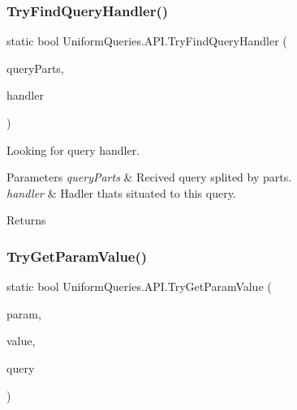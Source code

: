 \subsubsection{\texorpdfstring{Try\+Find\+Query\+Handler()}{TryFindQueryHandler()}\hspace{0.1cm}{\footnotesize\ttfamily [2/2]}}
{\footnotesize\ttfamily static bool Uniform\+Queries.\+A\+P\+I.\+Try\+Find\+Query\+Handler (\begin{DoxyParamCaption}\item[{\mbox{\hyperlink{struct_uniform_queries_1_1_query_part}{Query\+Part}} \mbox{[}$\,$\mbox{]}}]{query\+Parts,  }\item[{out \mbox{\hyperlink{interface_uniform_queries_1_1_i_query_handler}{I\+Query\+Handler}}}]{handler }\end{DoxyParamCaption})\hspace{0.3cm}{\ttfamily [static]}}



Looking for query handler. 


\begin{DoxyParams}{Parameters}
{\em query\+Parts} & Recived query splited by parts.\\
\hline
{\em handler} & Hadler that\textquotesingle{}s situated to this query.\\
\hline
\end{DoxyParams}
\begin{DoxyReturn}{Returns}

\end{DoxyReturn}
\mbox{\label{class_uniform_queries_1_1_a_p_i_a987eb23a48b90e542001cc12fcbc1ddc}} 
\subsubsection{\texorpdfstring{Try\+Get\+Param\+Value()}{TryGetParamValue()}\hspace{0.1cm}{\footnotesize\ttfamily [1/3]}}
{\footnotesize\ttfamily static bool Uniform\+Queries.\+A\+P\+I.\+Try\+Get\+Param\+Value (\begin{DoxyParamCaption}\item[{string}]{param,  }\item[{out string}]{value,  }\item[{string}]{query }\end{DoxyParamCaption})\hspace{0.3cm}{\ttfamily [static]}}



